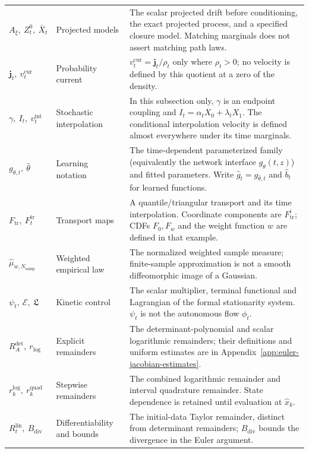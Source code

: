 \begin{longtable}{@{}>{\raggedright\arraybackslash}p{32mm}>{\raggedright\arraybackslash}p{26mm}>{\raggedright\arraybackslash}p{90mm}@{}}
$A_\xi,\ Z_t^0,\ \bar X_t$ & Projected models & The scalar projected drift before conditioning, the exact projected process, and a specified closure model. Matching marginals does not assert matching path laws.\\[3pt]
$\boldsymbol j_t,\ v_t^{\mathrm{cur}}$ & Probability current & $v_t^{\mathrm{cur}}=\boldsymbol j_t/\rho_t$ only where $\rho_t>0$; no velocity is defined by this quotient at a zero of the density.\\[3pt]
$\gamma,\ I_t,\ v_t^{\mathrm{int}}$ & Stochastic interpolation & In this subsection only, $\gamma$ is an endpoint coupling and $I_t=\alpha_tX_0+\lambda_tX_1$. The conditional interpolation velocity is defined almost everywhere under its time marginals.\\[3pt]
$g_{\theta,t},\ \widehat\theta$ & Learning notation & The time-dependent parameterized family (equivalently the network interface $g_\theta(t,z)$) and fitted parameters. Write $\widehat g_t=g_{\widehat\theta,t}$ and $\widehat b_t$ for learned functions.\\[3pt]
$F_{\mathrm{tr}},\ F_t^{\mathrm{tr}}$ & Transport maps & A quantile/triangular transport and its time interpolation. Coordinate components are $F_{\mathrm{tr}}^i$; CDFs $F_0,F_w$ and the weight function $w$ are defined in that example.\\[3pt]
$\widehat\mu_{w,N_{\mathrm{samp}}}$ & Weighted empirical law & The normalized weighted sample measure; finite-sample approximation is not a smooth diffeomorphic image of a Gaussian.\\[3pt]
$\psi_t,\ \mathcal E,\ \mathfrak L$ & Kinetic control & The scalar multiplier, terminal functional and Lagrangian of the formal stationarity system. $\psi_t$ is not the autonomous flow $\phi_t$.\\[3pt]
$R_A^{\det},\ r_{\log}$ & Explicit remainders & The determinant-polynomial and scalar logarithmic remainders; their definitions and uniform estimates are in Appendix~\ref{app:euler-jacobian-estimates}.\\[3pt]
$r_k^{\log},\ r_k^{\mathrm{quad}}$ & Stepwise remainders & The combined logarithmic remainder and interval quadrature remainder. State dependence is retained until evaluation at $\widehat x_k$.\\[3pt]
$R_t^{\mathrm{lin}},\ B_{\mathrm{div}}$ & Differentiability and bounds & The initial-data Taylor remainder, distinct from determinant remainders; $B_{\mathrm{div}}$ bounds the divergence in the Euler argument.\\[3pt]

\end{longtable}
